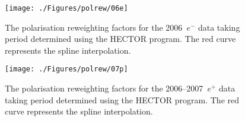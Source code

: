 
\begin{figure}[h]
 \begin{center}
 \texttt{[image: ./Figures/polrew/06e]}
\end{center}
\caption{The polarisation reweighting factors for the 2006~$e^-$ data taking period determined using the HECTOR program. The red curve represents the spline interpolation.}
\label{fig:polcor06e}
\end{figure} 

\begin{figure}[h]
 \begin{center}
 \texttt{[image: ./Figures/polrew/07p]}
\end{center}
\caption{The polarisation reweighting factors for the 2006--2007~$e^+$ data taking period determined using the HECTOR program. The red curve represents the spline interpolation.}
\label{fig:polcor06e}
\end{figure} 